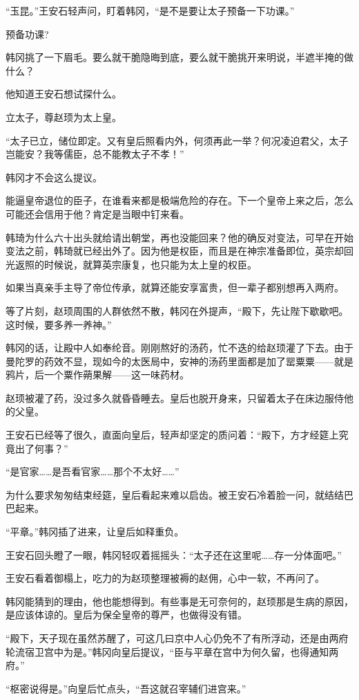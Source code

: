 “玉昆。”王安石轻声问，盯着韩冈，“是不是要让太子预备一下功课。”

预备功课?

韩冈挑了一下眉毛。要么就干脆隐晦到底，要么就干脆挑开来明说，半遮半掩的做什么？

他知道王安石想试探什么。

立太子，尊赵顼为太上皇。

“太子已立，储位即定。又有皇后照看内外，何须再此一举？何况凌迫君父，太子岂能安？我等儒臣，总不能教太子不孝！”

韩冈才不会这么提议。

能逼皇帝退位的臣子，在谁看来都是极端危险的存在。下一个皇帝上来之后，怎么可能还会信用于他？肯定是当眼中钉来看。

韩琦为什么六十出头就给请出朝堂，再也没能回来？他的确反对变法，可早在开始变法之前，韩琦就已经出外了。因为他是权臣，而且是在神宗准备即位，英宗却回光返照的时候说，就算英宗康复，也只能为太上皇的权臣。

如果当真亲手主导了帝位传承，就算还能安享富贵，但一辈子都别想再入两府。

等了片刻，赵顼周围的人群依然不散，韩冈在外提声，“殿下，先让陛下歇歇吧。这时候，要多养一养神。”

韩冈的话，让殿中人如奉纶音。刚刚熬好的汤药，忙不迭的给赵顼灌了下去。由于曼陀罗的药效不显，现如今的太医局中，安神的汤药里面都是加了罂粟粟——就是鸦片，后一个粟作蒴果解——这一味药材。

赵顼被灌了药，没过多久就昏昏睡去。皇后也脱开身来，只留着太子在床边服侍他的父皇。

王安石已经等了很久，直面向皇后，轻声却坚定的质问着：“殿下，方才经筵上究竟出了何事？”

“是官家……是吾看官家……那个不太好……”

为什么要求匆匆结束经筵，皇后看起来难以启齿。被王安石冷着脸一问，就结结巴巴起来。

“平章。”韩冈插了进来，让皇后如释重负。

王安石回头瞪了一眼，韩冈轻叹着摇摇头：“太子还在这里呢……存一分体面吧。”

王安石看着御榻上，吃力的为赵顼整理被褥的赵佣，心中一软，不再问了。

韩冈能猜到的理由，他也能想得到。有些事是无可奈何的，赵顼那是生病的原因，是应该体谅的。皇后为保全皇帝的尊严，也做得没有错。

“殿下，天子现在虽然苏醒了，可这几曰京中人心仍免不了有所浮动，还是由两府轮流宿卫宫中为是。”韩冈向皇后提议，“臣与平章在宫中为何久留，也得通知两府。”

“枢密说得是。”向皇后忙点头，“吾这就召宰辅们进宫来。”

